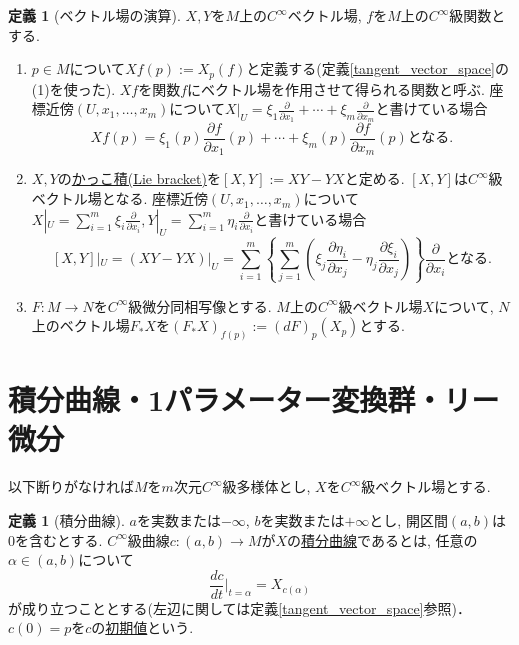\documentclass[dvipdfmx,a4paper,11pt]{article}
\theoremstyle{definition}
\newtheorem{dfn}[thm]{定義}
\newcommand{\pdrv}[2]{\frac{\partial #1}{\partial #2}}
\newcommand{\drv}[2]{\frac{d #1}{d#2}}
\begin{document}
 
 
    \begin{tcolorbox}[
    colback = white,
    colframe = green!35!black,
    fonttitle = \bfseries,
    breakable = true]
    \begin{dfn}[ベクトル場の演算]
    $X,Y$を$M$上の$C^{\infty}$ベクトル場, $f$を$M$上の$C^{\infty}$級関数とする. 
    \begin{enumerate}
        \setlength{\parskip}{0cm}
  \setlength{\itemsep}{2pt} 
    \item $p \in M$について$Xf(p) := X_{p} (f)$と定義する(定義\ref{tangent_vector_space}の(1)を使った). $Xf$を関数$f$にベクトル場を作用させて得られる関数と呼ぶ. 
    座標近傍$(U, x_1, \ldots, x_m)$について$X|_{U} = \xi_1 \pdrv{}{x_1} + \cdots +\xi_m \pdrv{}{x_m}$と書けている場合
    $$
    Xf(p) =  \xi_1(p) \pdrv{f}{x_1}(p) + \cdots +\xi_m(p) \pdrv{f}{x_m}(p) \text{となる.}
    $$
    \item $X,Y$の\underline{かっこ積(Lie bracket)}を$[X,Y]:= XY -YX$と定める. $[X,Y]$は$C^{\infty}$級ベクトル場となる. 座標近傍$(U, x_1, \ldots, x_m)$について$X|_{U} = \sum_{i=1}^{m}\xi_i \pdrv{}{x_i}, Y|_{U} = \sum_{i=1}^{m}\eta_i \pdrv{}{x_i}$と書けている場合
    $$
        [X, Y]|_{U} = (XY-YX)|_{U} =  
    \sum_{i=1}^{m} \left\{ \sum_{j=1}^{m} \left(  \xi_j\pdrv{\eta_i}{x_j} -  \eta_j\pdrv{\xi_i}{x_j} \right) \right\}\pdrv{}{x_i}
    \text{となる.}
    $$
    \item $F: M \rightarrow N$を$C^{\infty}$級微分同相写像とする. $M$上の$C^{\infty}$級ベクトル場$X$について, $N$上のベクトル場$F_{*}X$を$
    (F_{*}X)_{f(p)} := (dF)_{p}(X_{p}) \text{とする.}
    $
    \end{enumerate}
    \end{dfn}
    \end{tcolorbox}

\section{積分曲線・1パラメーター変換群・リー微分}
以下断りがなければ$M$を$m$次元$C^\infty$級多様体とし, $X$を$C^{\infty}$級ベクトル場とする. 
    \begin{tcolorbox}[
    colback = white,
    colframe = green!35!black,
    fonttitle = \bfseries,
    breakable = true]
    \begin{dfn}[積分曲線]
    
 $a$を実数または$- \infty$, $b$を実数または$+\infty$とし, 開区間$(a,b)$は$0$を含むとする.
 $C^{\infty}$級曲線$c : (a,b) \rightarrow M$が$X$の\underline{積分曲線}であるとは, 任意の$\alpha \in (a,b)$について
    $$
    \drv{c}{t}\Bigr|_{t=\alpha} =X_{c(\alpha)}
    $$
    が成り立つこととする(左辺に関しては定義\ref{tangent_vector_space}参照)．
    $c(0)=p$を$c$の\underline{初期値}という.
   
    \end{dfn}
    \end{tcolorbox}
 
\end{document}
